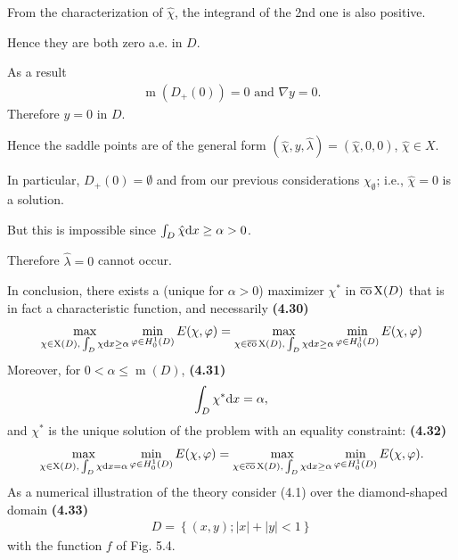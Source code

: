 \documentclass{book}
\numberwithin{equation}{section}
\begin{document}
\begin{enumerate}
    From the characterization of $\hat{\chi}$, the integrand of the 2nd one is also positive.
    
    Hence they are both zero a.e. in $D$.
    
    As a result
    \begin{align*}
        \operatorname{m}\left(D_+(0)\right) = 0 \mbox{ and } \nabla y = 0.
    \end{align*}
    Therefore $y = 0$ in $D$.
    
    Hence the saddle points are of the general form $(\hat{\chi},y,\hat{\lambda}) = (\hat{\chi},0,0)$, $\hat{\chi}\in X$.
    
    In particular, $D_+(0) = \emptyset$ and from our previous considerations $\chi_\emptyset$; i.e., $\hat{\chi} = 0$ is a solution.
    
    But this is impossible since $\int_D \hat{\chi}{\rm d}x\ge\alpha > 0$.
    
    Therefore $\hat{\lambda} = 0$ cannot occur.
    
    In conclusion, there exists a (unique for $\alpha > 0$) maximizer $\chi^*$ in $\overline{\rm co}\operatorname{X}(D)$ that is in fact a characteristic function, and necessarily \textbf{(4.30)}
    \begin{align*}
        \max_{\chi\in\operatorname{X}(D),\,\int_D \chi{\rm d}x\ge\alpha}\min_{\varphi\in H_0^1(D)} E(\chi,\varphi) = \max_{\chi\in\overline{\rm co}\operatorname{X}(D),\,\int_D \chi{\rm d}x\ge\alpha}\min_{\varphi\in H_0^1(D)} E(\chi,\varphi)
    \end{align*}
    Moreover, for $0 < \alpha\le\operatorname{m}(D)$, \textbf{(4.31)}
    \begin{align*}
        \int_D \chi^*{\rm d}x = \alpha,
    \end{align*}
    and $\chi^*$ is the unique solution of the problem with an equality constraint: \textbf{(4.32)}
    \begin{align*}
        \max_{\chi\in\operatorname{X}(D),\,\int_D \chi{\rm d}x = \alpha}\min_{\varphi\in H_0^1(D)} E(\chi,\varphi) = \max_{\chi\in\overline{\rm co}\operatorname{X}(D),\,\int_D \chi{\rm d}x\ge\alpha}\min_{\varphi\in H_0^1(D)} E(\chi,\varphi).
    \end{align*}
    As a numerical illustration of the theory consider (4.1) over the diamond-shaped domain \textbf{(4.33)}
    \begin{align*}
        D = \left\{(x,y);|x| + |y| < 1\right\}
    \end{align*}
    with the function $f$ of Fig. 5.4.
    

\end{enumerate}
\end{document}
